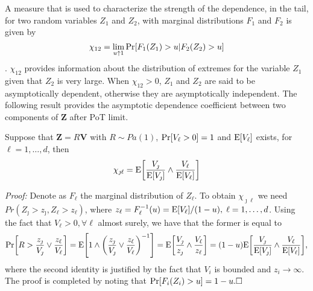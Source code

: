 A measure that is used to characterize the strength of the dependence,
in the tail, for two random variables $Z_1$ and $Z_2$, with marginal
distributions $F_1$ and $F_2$ is given by
\[	\chi_{12} = \lim_{u\uparrow 1} \prob{F_1(Z_1)>u|F_2(Z_2)>u}  \]
\citep{coles2001}.
$\chi_{12}$ provides information about the distribution of extremes for the variable $Z_1$
given that $Z_2$ is very large.  When $\chi_{12}>0$, $Z_1$ and $Z_2$ 
are said to
be asymptotically dependent, otherwise they are asymptotically
independent. The following result provides the asymptotic dependence coefficient between two components of $\bm{Z}$
after PoT limit. 
\begin{prop}\label{ppchi}
Suppose that $\bm{Z} = R\bm{V}$ with $R\sim Pa(1)$,
$\prob{V_\ell > 0} = 1$ and $\expect{V_\ell}$ exists, for $\ell=1, \ldots ,d$, then
\begin{equation}
    \label{eqn:chi_ij}
	\chi_{\jmath\ell} = \expect{\frac{V_\jmath}{\expect{V_\jmath}} \wedge \frac{V_\ell}{\expect{V_\ell}}}
\end{equation}
\end{prop}
{\em Proof:}
Denote as $F_\ell$ the marginal distribution of $Z_\ell$. To obtain $\chi_{\jmath\ell}$ we need $Pr(Z_\jmath>z_\jmath,Z_\ell>z_\ell)$, where $z_\ell =
F_\ell^{-1}(u) = \expect{V_\ell}/(1 - u), \;\ell=1,\dots, d$.
Using the fact that
$V_\ell>0, \forall \ell$ almost surely, we have that the former is equal to
\begin{equation*}
\prob{R>\frac{z_\jmath}{V_\jmath}\vee\frac{z_\ell}{V_\ell}}
    = \expect{1\wedge\left(\frac{z_\jmath}{V_\jmath}\vee\frac{z_\ell}{V_\ell}\right)^{-1}}
    = \expect{\frac{V_\jmath}{z_\jmath}\wedge\frac{V_\ell}{z_\ell}}
    = (1 - u)\expect{\frac{V_\jmath}{\expect{V_\jmath}}\wedge\frac{V_\ell}{\expect{V_\ell}}},
\end{equation*}
where the second identity is justified by the fact that $V_i$ is
bounded and $z_i\rightarrow\infty$. The proof is completed by noting
that $\prob{F_i(Z_i)>u} = 1 - u.\hfill\Box$

